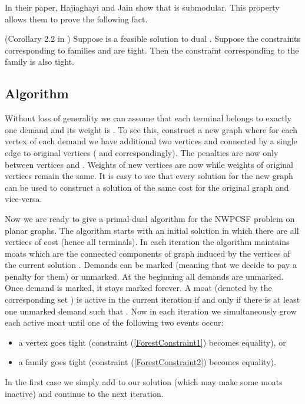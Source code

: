 In their paper, Hajiaghayi and Jain show that  is submodular. This property allows them to prove the following fact.
\begin{fact} (Corollary 2.2 in \cite{Hajiaghayi})
\label{SumTight}
Suppose  is a feasible solution to dual . Suppose the constraints corresponding to families  and  are tight. Then the constraint corresponding to the family  is also tight.
\end{fact}
\newpage
\subsection{Algorithm}
Without loss of generality we can assume that each terminal  belongs to exactly one demand and its weight  is . To see this, construct a new graph where for each vertex  of each demand  we have additional two vertices  and  connected by a single edge to original vertices ( and  correspondingly). The penalties are now only between vertices  and . Weights of new vertices are now  while weights of original vertices  remain the same. It is easy to see that every solution for the new graph can be used to construct a solution of the same cost for the original graph and vice-versa.

Now we are ready to give a primal-dual algorithm for the NWPCSF problem on planar graphs.
The algorithm starts with an initial solution  in which there are all vertices of cost  (hence all terminals). In each iteration the algorithm maintains moats which are the connected components of graph  induced by the vertices of the current solution . Demands can be marked (meaning that we decide to pay a penalty for them) or unmarked. At the beginning all demands are unmarked. Once demand is marked, it stays marked forever. A moat (denoted by the corresponding set ) is active in the current iteration if and only if there is at least one unmarked demand  such that . Now in each iteration we simultaneously grow each active moat until one of the following two events occur:
\begin{itemize}
	\item a vertex  goes tight (constraint (\ref{ForestConstraint1}) becomes equality), or
	\item a family  goes tight (constraint (\ref{ForestConstraint2}) becomes equality).
\end{itemize}

In the first case we simply add  to our solution  (which may make some moats inactive) and continue to the next iteration.

